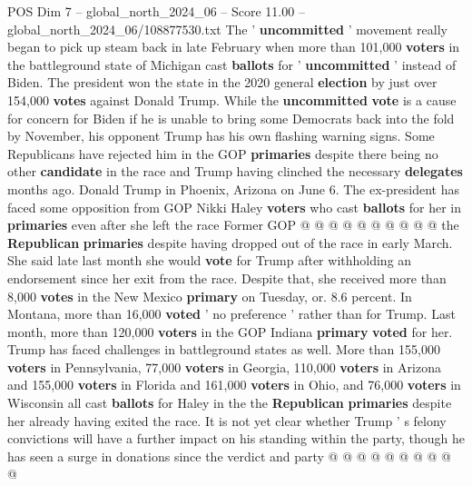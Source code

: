 \begin{textsample}{POS Dim 7 – global\_north\_2024\_06 – Score 11.00 – global\_north\_2024\_06/108877530.txt}
The ' \textbf{uncommitted} ' movement really began to pick up steam back in late February when more than 101,000 \textbf{voters} in the battleground state of Michigan cast \textbf{ballots} for ' \textbf{uncommitted} ' instead of Biden.
The president won the state in the 2020 general \textbf{election} by just over 154,000 \textbf{votes} against Donald Trump.
While the \textbf{uncommitted} \textbf{vote} is a cause for concern for Biden if he is unable to bring some Democrats back into the fold by November, his opponent Trump has his own flashing warning signs.
Some Republicans have rejected him in the GOP \textbf{primaries} despite there being no other \textbf{candidate} in the race and Trump having clinched the necessary \textbf{delegates} months ago.
Donald Trump in Phoenix, Arizona on June 6.
The ex-president has faced some opposition from GOP Nikki Haley \textbf{voters} who cast \textbf{ballots} for her in \textbf{primaries} even after she left the race Former GOP @ @ @ @ @ @ @ @ @ @ the \textbf{Republican} \textbf{primaries} despite having dropped out of the race in early March.
She said late last month she would \textbf{vote} for Trump after withholding an endorsement since her exit from the race.
Despite that, she received more than 8,000 \textbf{votes} in the New Mexico \textbf{primary} on Tuesday, or. 8.6 percent.
In Montana, more than 16,000 \textbf{voted} ' no preference ' rather than for Trump.
Last month, more than 120,000 \textbf{voters} in the GOP Indiana \textbf{primary} \textbf{voted} for her.
Trump has faced challenges in battleground states as well.
More than 155,000 \textbf{voters} in Pennsylvania, 77,000 \textbf{voters} in Georgia, 110,000 \textbf{voters} in Arizona and 155,000 \textbf{voters} in Florida and 161,000 \textbf{voters} in Ohio, and 76,000 \textbf{voters} in Wisconsin all cast \textbf{ballots} for Haley in the the \textbf{Republican} \textbf{primaries} despite her already having exited the race.
It is not yet clear whether Trump ' s felony convictions will have a further impact on his standing within the party, though he has seen a surge in donations since the verdict and party @ @ @ @ @ @ @ @ @ @

\end{textsample}
